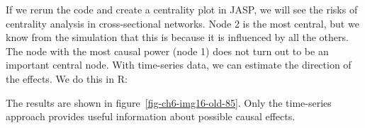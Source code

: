 \documentclass[
  a4paper,
  DIV=11,
  numbers=noendperiod,
  oneside]{scrreprt}
\newenvironment{Shaded}{}{}
\newcommand{\AttributeTok}[1]{\textcolor[rgb]{0.84,0.23,0.29}{#1}}
\newcommand{\CommentTok}[1]{\textcolor[rgb]{0.42,0.45,0.49}{#1}}
\newcommand{\DecValTok}[1]{\textcolor[rgb]{0.00,0.36,0.77}{#1}}
\newcommand{\FunctionTok}[1]{\textcolor[rgb]{0.44,0.26,0.76}{#1}}
\newcommand{\NormalTok}[1]{\textcolor[rgb]{0.14,0.16,0.18}{#1}}
\newcommand{\OtherTok}[1]{\textcolor[rgb]{0.44,0.26,0.76}{#1}}
\newcommand{\SpecialCharTok}[1]{\textcolor[rgb]{0.00,0.36,0.77}{#1}}
\newcommand{\StringTok}[1]{\textcolor[rgb]{0.01,0.18,0.38}{#1}}
\begin{document}
If we rerun the code and create a centrality plot in JASP, we will see
the risks of centrality analysis in cross-sectional networks. Node 2 is
the most central, but we know from the simulation that this is because
it is influenced by all the others. The node with the most causal power
(node 1) does not turn out to be an important central node. With
time-series data, we can estimate the direction of the effects. We do
this in R:

\begin{Shaded}
\end{Shaded}

The results are shown in figure~\ref{fig-ch6-img16-old-85}. Only the
time-series approach provides useful information about possible causal
effects.
\end{document}
